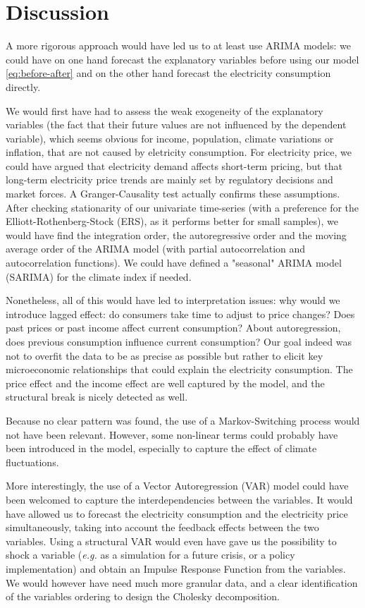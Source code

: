 \section{Discussion}
A more rigorous approach would have led us to at least use ARIMA models: we could have on one hand forecast the explanatory variables before using our model \eqref{eq:before-after} and on the other hand forecast the electricity consumption directly.

We would first have had to assess the weak exogeneity of the explanatory variables (the fact that their future values are not influenced by the dependent variable), which seems obvious for income, population, climate variations or inflation, that are not caused by eletricity consumption. For electricity price, we could have argued that electricity demand affects short-term pricing, but that long-term electricity price trends are mainly set by regulatory decisions and market forces. A Granger-Causality test actually confirms these assumptions. After checking stationarity of our univariate time-series (with a preference for the Elliott-Rothenberg-Stock (ERS), as it performs better for small samples), we would have find the integration order, the autoregressive order and the moving average order of the ARIMA model (with partial autocorrelation and autocorrelation functions). We could have defined a "seasonal" ARIMA model (SARIMA) for the climate index if needed. 

Nonetheless, all of this would have led to interpretation issues: why would we introduce lagged effect: do consumers take time to adjust to price changes? Does past prices or past income affect current consumption? About autoregression, does previous consumption influence current consumption? Our goal indeed was not to overfit the data to be as precise as possible but rather to elicit key microeconomic relationships that could explain the electricity consumption. The price effect and the income effect are well captured by the model, and the structural break is nicely detected as well.

Because no clear pattern was found, the use of a Markov-Switching process would not have been relevant. However, some non-linear terms could probably have been introduced in the model, especially to capture the effect of climate fluctuations. 

More interestingly, the use of a Vector Autoregression (VAR) model could have been welcomed to capture the interdependencies between the variables. It would have allowed us to forecast the electricity consumption and the electricity price simultaneously, taking into account the feedback effects between the two variables. Using a structural VAR would even have gave us the possibility to shock a variable (\textit{e.g.} as a simulation for a future crisis, or a policy implementation) and obtain an Impulse Response Function from the variables. We would however have need much more granular data, and a clear identification of the variables ordering to design the Cholesky decomposition.

